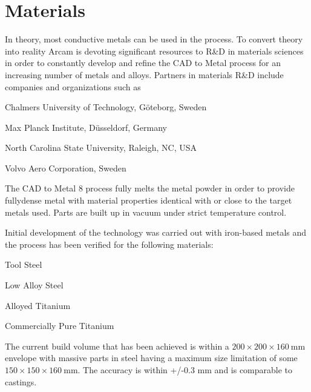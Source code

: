 \documentclass[10pt]{article}
\begin{document}
\section*{Materials}
In theory, most conductive metals can be used in the process. To convert theory into reality Arcam is devoting significant resources to R\&D in materials sciences in order to constantly develop and refine the CAD to Metal process for an increasing number of metals and alloys. Partners in materials R\&D include companies and organizations such as

Chalmers University of Technology, Göteborg, Sweden

Max Planck Institute, Düsseldorf, Germany

North Carolina State University, Raleigh, NC, USA

Volvo Aero Corporation, Sweden

The CAD to Metal 8 process fully melts the metal powder in order to provide fullydense metal with material properties identical with or close to the target metals used. Parts are built up in vacuum under strict temperature control.

Initial development of the technology was carried out with iron-based metals and the process has been verified for the following materials:

Tool Steel

Low Alloy Steel

Alloyed Titanium

Commercially Pure Titanium

The current build volume that has been achieved is within a $200 \times 200 \times 160 \mathrm{~mm}$ envelope with massive parts in steel having a maximum size limitation of some $150 \times 150 \times 160 \mathrm{~mm}$. The accuracy is within +/-0.3 mm and is comparable to castings.
\end{document}
